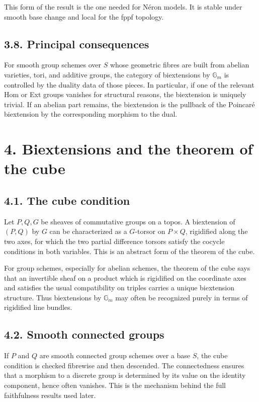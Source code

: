 \documentclass[11pt]{article}
\theoremstyle{plain}
\theoremstyle{definition}
\theoremstyle{remark}
\newcommand{\Gm}{\mathbb G_m}
\begin{document}
This form of the result is the one needed for Néron models. It is stable under
smooth base change and local for the fppf topology.

\subsection*{3.8. Principal consequences}

For smooth group schemes over \(S\) whose geometric fibres are built from
abelian varieties, tori, and additive groups, the category of biextensions by
\(\Gm\) is controlled by the duality data of those pieces. In particular, if one
of the relevant Hom or Ext groups vanishes for structural reasons, the
biextension is uniquely trivial. If an abelian part remains, the biextension is
the pullback of the Poincaré biextension by the corresponding morphism to the
dual.

\section*{4. Biextensions and the theorem of the cube}

\subsection*{4.1. The cube condition}

Let \(P,Q,G\) be sheaves of commutative groups on a topos. A biextension of
\((P,Q)\) by \(G\) can be characterized as a \(G\)-torsor on \(P\times Q\),
rigidified along the two axes, for which the two partial difference torsors
satisfy the cocycle conditions in both variables. This is an abstract form of the
theorem of the cube.

For group schemes, especially for abelian schemes, the theorem of the cube says
that an invertible sheaf on a product which is rigidified on the coordinate axes
and satisfies the usual compatibility on triples carries a unique biextension
structure. Thus biextensions by \(\Gm\) may often be recognized purely in terms
of rigidified line bundles.

\subsection*{4.2. Smooth connected groups}

If \(P\) and \(Q\) are smooth connected group schemes over a base \(S\), the cube
condition is checked fibrewise and then descended. The connectedness ensures that
a morphism to a discrete group is determined by its value on the identity
component, hence often vanishes. This is the mechanism behind the full
faithfulness results used later.
\end{document}
